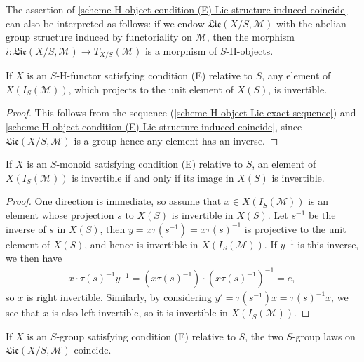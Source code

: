 \begin{remark}\label{scheme S-H-functor condition (E) morphism i prop}
The assertion of \cref{scheme H-object condition (E) Lie structure induced coincide} can also be interpreted as follows: if we endow $\mathfrak{Lie}(X/S,\mathscr{M})$ with the abelian group structure induced by functoriality on $\mathscr{M}$, then the morphism $i:\mathfrak{Lie}(X/S,\mathscr{M})\to T_{X/S}(\mathscr{M})$ is a morphism of $S$-H-objects.
\end{remark}

\begin{corollary}\label{scheme S-H-functor condition (E) invertible if project to unit}
If $X$ is an $S$-H-functor satisfying condition (E) relative to $S$, any element of $X(I_S(\mathscr{M}))$, which projects to the unit element of $X(S)$, is invertible.
\end{corollary}
\begin{proof}
This follows from the sequence (\ref{scheme H-object Lie exact sequence}) and \cref{scheme H-object condition (E) Lie structure induced coincide}, since $\mathfrak{Lie}(X/S,\mathscr{M})$ is a group hence any element has an inverse.
\end{proof}

\begin{corollary}\label{scheme S-monoid condition (E) invertible iff image in X(S)}
If $X$ is an $S$-monoid satisfying condition (E) relative to $S$, an element of $X(I_S(\mathscr{M}))$ is invertible if and only if its image in $X(S)$ is invertible.
\end{corollary}
\begin{proof}
One direction is immediate, so assume that $x\in X(I_S(\mathscr{M}))$ is an element whose projection $s$ to $X(S)$ is invertible in $X(S)$. Let $s^{-1}$ be the inverse of $s$ in $X(S)$, then $y=x\tau(s^{-1})=x\tau(s)^{-1}$ is projective to the unit element of $X(S)$, and hence is invertible in $X(I_S(\mathscr{M}))$. If $y^{-1}$ is this inverse, we then have
\begin{align*}
x\cdot\tau(s)^{-1}y^{-1}=(x\tau(s)^{-1})\cdot(x\tau(s)^{-1})^{-1}=e,
\end{align*}
so $x$ is right invertible. Similarly, by considering $y'=\tau(s^{-1})x=\tau(s)^{-1}x$, we see that $x$ is also left invertible, so it is invertible in $X(I_S(\mathscr{M}))$.
\end{proof}

\begin{corollary}
If $X$ is an $S$-group satisfying condition (E) relative to $S$, the two $S$-group laws on $\mathfrak{Lie}(X/S,\mathscr{M})$ coincide.
\end{corollary}

